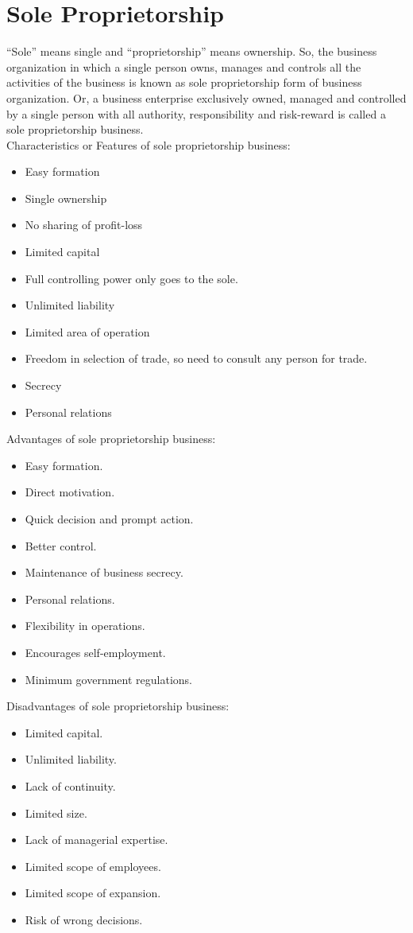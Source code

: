 \documentclass[11pt]{book}
\begin{document}
\chapter{Sole Proprietorship}
\enquote{Sole} means single and \enquote{proprietorship} means ownership. So, the business organization in which a single person owns, manages and controls all the activities of the business is known as sole proprietorship form of business organization. Or, a business enterprise exclusively owned, managed and controlled by a single person with all authority, responsibility and risk-reward is called a sole proprietorship business. \\
Characteristics or Features of sole proprietorship business:
\begin{itemize}
	\item Easy formation
	\item Single ownership
	\item No sharing of profit-loss
	\item Limited capital
	\item Full controlling power only goes to the sole.
	\item Unlimited liability
	\item Limited area of operation
	\item Freedom in selection of trade, so need to consult any person for trade.
	\item Secrecy
	\item Personal relations
\end{itemize}
Advantages of sole proprietorship business:
\begin{itemize}
	\item Easy formation.
	\item Direct motivation.
	\item Quick decision and prompt action.
	\item Better control.
	\item Maintenance of business secrecy.
	\item Personal relations.
	\item Flexibility in operations.
	\item Encourages self-employment.
	\item Minimum government regulations.
\end{itemize}
Disadvantages of sole proprietorship business:
\begin{itemize}
	\item Limited capital.
	\item Unlimited liability.
	\item Lack of continuity.
	\item Limited size.
	\item Lack of managerial expertise.
	\item Limited scope of employees.
	\item Limited scope of expansion.
	\item Risk of wrong decisions.
\end{itemize}
\end{document}
